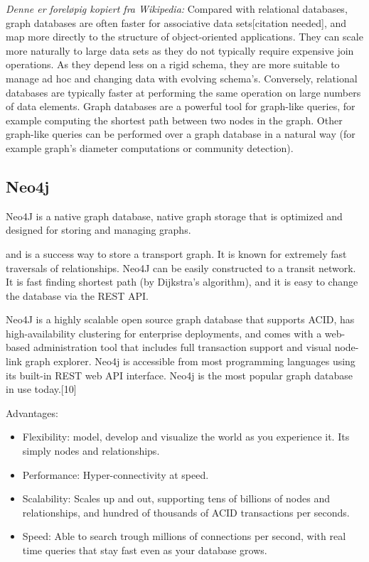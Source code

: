 \textit{Denne er foreløpig kopiert fra Wikipedia: }%
Compared with relational databases, graph databases are often faster for associative data sets[citation needed], and map more directly to the structure of object-oriented applications. They can scale more naturally to large data sets as they do not typically require expensive join operations. As they depend less on a rigid schema, they are more suitable to manage ad hoc and changing data with evolving schema's. Conversely, relational databases are typically faster at performing the same operation on large numbers of data elements.
Graph databases are a powerful tool for graph-like queries, for example computing the shortest path between two nodes in the graph. Other graph-like queries can be performed over a graph database in a natural way (for example graph's diameter computations or community detection).

\subsection{Neo4j}
Neo4J \citep{website:neo4j} is a native graph database, native graph storage that is optimized and designed for
storing and managing graphs.

and is a success way to store a transport graph. It is known for extremely fast traversals of relationships. Neo4J can be easily constructed to a transit network. It is fast finding shortest path (by Dijkstra's algorithm), and it is easy to change the database via the REST API. 

Neo4J is a highly scalable open source graph database that supports ACID, has high-availability clustering for enterprise deployments, and comes with a web-based administration tool that includes full transaction support and visual node-link graph explorer. Neo4j is accessible from most programming languages using its built-in REST web API interface. Neo4j is the most popular graph database in use today.[10]

Advantages:
\begin{itemize} 
\item Flexibility: model, develop and visualize the world as you experience it. Its simply nodes and relationships. 
\item Performance: Hyper-connectivity at speed. 
\item Scalability: Scales up and out, supporting tens of billions of nodes and relationships, and hundred of thousands of ACID transactions per seconds. 
\item Speed: Able to search trough millions of connections per second, with real time queries that stay fast even as your database grows. 
\end{itemize}

